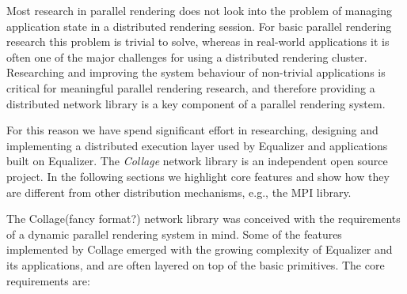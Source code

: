 Most research in parallel rendering does not look into the problem of managing
application state in a distributed rendering session. For basic parallel
rendering research this problem is trivial to solve, whereas in real-world
applications it is often one of the major challenges for using a distributed
rendering cluster. Researching and improving the system behaviour of
non-trivial applications is critical for meaningful parallel rendering
research, and therefore providing a distributed network library is a key
component of a parallel rendering system.

For this reason we have spend significant effort in researching, designing and
implementing a distributed execution layer used by Equalizer and
applications built on Equalizer. The {\em Collage} network library is an
independent open source project. In the following sections we highlight core
features and show how they are different from other distribution mechanisms,
e.g., the MPI library.

The Collage(fancy format?) network library was conceived with the requirements of a dynamic
parallel rendering system in mind. Some of the features implemented by Collage
emerged with the growing complexity of Equalizer and its applications, and are
often layered on top of the basic primitives. The core requirements are:

